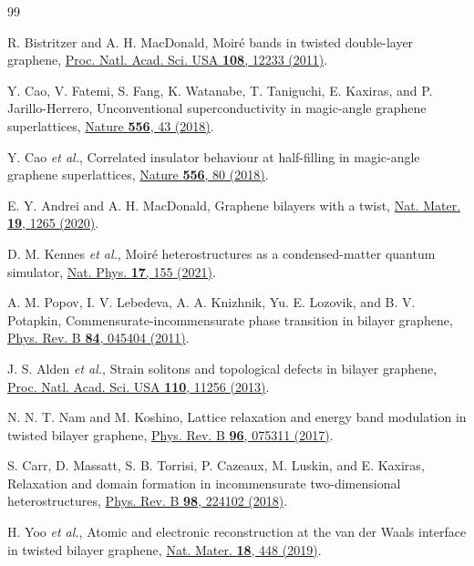 \documentclass[prb,twocolumn,superscriptaddress,floatfix,10pt]{revtex4-2}
\begin{document}
\begin{thebibliography}{99}

 R. Bistritzer and A. H. MacDonald, Moir\'e bands in twisted double-layer graphene, \href{https://doi.org/10.1073/pnas.1108174108}{Proc. Natl. Acad. Sci. USA \textbf{108}, 12233 (2011)}.

 Y. Cao, V. Fatemi, S. Fang, K. Watanabe, T. Taniguchi, E. Kaxiras, and P. Jarillo-Herrero, Unconventional superconductivity in magic-angle graphene superlattices, \href{https://doi.org/10.1038/nature26160}{Nature \textbf{556}, 43 (2018)}.

 Y. Cao \emph{et al.}, Correlated insulator behaviour at half-filling in magic-angle graphene superlattices, \href{https://doi.org/10.1038/nature26154}{Nature \textbf{556}, 80 (2018)}.

 E. Y. Andrei and A. H. MacDonald, Graphene bilayers with a twist, \href{https://doi.org/10.1038/s41563-020-00840-0}{Nat. Mater. \textbf{19}, 1265 (2020)}.

 D. M. Kennes \emph{et al.}, Moir\'e heterostructures as a condensed-matter quantum simulator, \href{https://doi.org/10.1038/s41567-020-01154-3}{Nat. Phys. \textbf{17}, 155 (2021)}.

 A. M. Popov, I. V. Lebedeva, A. A. Knizhnik, Yu. E. Lozovik, and B. V. Potapkin, Commensurate-incommensurate phase transition in bilayer graphene, \href{https://doi.org/10.1103/PhysRevB.84.045404}{Phys. Rev. B \textbf{84}, 045404 (2011)}.

 J. S. Alden \emph{et al.}, Strain solitons and topological defects in bilayer graphene, \href{https://doi.org/10.1073/pnas.1309394110}{Proc. Natl. Acad. Sci. USA \textbf{110}, 11256 (2013)}.

 N. N. T. Nam and M. Koshino, Lattice relaxation and energy band modulation in twisted bilayer graphene, \href{https://doi.org/10.1103/PhysRevB.96.075311}{Phys. Rev. B \textbf{96}, 075311 (2017)}.

 S. Carr, D. Massatt, S. B. Torrisi, P. Cazeaux, M. Luskin, and E. Kaxiras, Relaxation and domain formation in incommensurate two-dimensional heterostructures, \href{https://doi.org/10.1103/PhysRevB.98.224102}{Phys. Rev. B \textbf{98}, 224102 (2018)}.

 H. Yoo \emph{et al.}, Atomic and electronic reconstruction at the van der Waals interface in twisted bilayer graphene, \href{https://doi.org/10.1038/s41563-019-0346-z}{Nat. Mater. \textbf{18}, 448 (2019)}.


\end{thebibliography}
\end{document}
